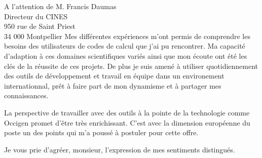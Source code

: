 \documentclass[10pt,a4paper]{lettre}
\begin{document}
\begin{letter}{A l'attention de M. Francis Daumas\\Directeur du CINES\\950 rue de Saint Priest\\34 000 Montpellier}
{Mes différentes expériences m'ont permis de comprendre les besoins des utilisateurs de codes
de calcul que j'ai pu rencontrer. Ma capacité d'adaption à ces domaines scientifiques variés
ainsi que mon écoute ont été les clés de la réussite de ces projets.
De plus je suis amené à utiliser quotidiennement des outils de
développement et travail en équipe dans un environement internationnal,
prêt à faire part de mon dynamisme et à partager mes connaissances.
}

{
La perspective de travailler avec des outils à la pointe de la technologie
comme Occigen promet d'être très enrichissant.
C'est avec la dimension européenne du poste un des points qui m'a poussé à
postuler pour cette offre.
}

\closing{Je vous prie d'agréer, monsieur, l'expression de mes sentiments distingués.}
\end{letter}
\end{document}
